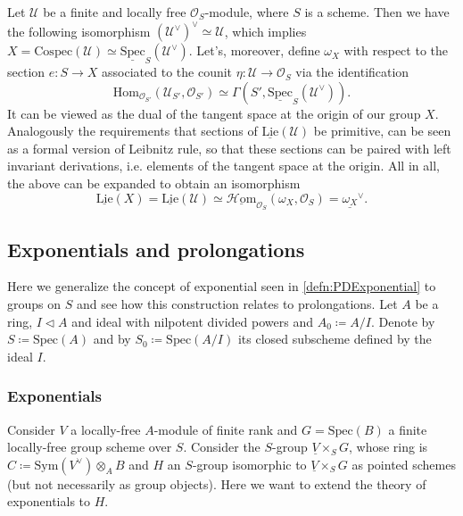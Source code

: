 \begin{rem}\label{LieDualConormalSheaf}
	Let $\mathcal{U}$ be a finite and locally free $\mathcal{O}_{ S }$-module,
	where $S$ is a scheme.
	Then we have the following isomorphism $(\mathcal{U}^\vee)^\vee \simeq \mathcal{U}$,
	which implies $X = \mathrm{Cospec}(\mathcal{U}) \simeq 
	\underline{\mathrm{Spec}}_S(\mathcal{U}^\vee)$.
	Let's, moreover, define $\omega_X$ with respect to the section $e\colon S \to X$
	associated to the counit $\eta\colon \mathcal{U} \to \mathcal{O}_{ S }$
	via the identification
	\begin{equation*}
		\mathrm{Hom}_{ \mathcal{O}_{ S' }}
		\left( \mathcal{U}_{S'}, \mathcal{O}_{ S' } \right) 
		\simeq
		\Gamma(S', \underline{\mathrm{Spec}}_S(\mathcal{U}^\vee))
	.\end{equation*}
	It can be viewed as the dual of the tangent space at the origin
	of our group $X$.
	Analogously the requirements that sections of $\underline{\mathrm{Lie}}(\mathcal{U})$
	be primitive, can be seen as a formal version of Leibnitz rule,
	so that these sections can be paired with left invariant derivations, i.e$.$
	elements of the tangent space at the origin.
	All in all, the above can be expanded to obtain an isomorphism
	\begin{equation*}
		\underline{\mathrm{Lie}}(X) =
		\underline{\mathrm{Lie}}(\mathcal{U}) \simeq
		\underline{\mathcal{H}\mathrm{om}}_{ \mathcal{O}_{ S } } 
		\left(\omega_X , \mathcal{O}_{ S } \right) =
		\underline{\omega_X}^\vee
	.\end{equation*}
\end{rem}


\subsection{Exponentials and prolongations}
Here we generalize the concept of exponential seen in \cref{defn:PDExponential}
to groups on $S$ and see how this construction relates to prolongations.
Let $A$ be a ring, $I \triangleleft A$ and ideal with nilpotent
divided powers and $A_0 \coloneqq A/I$.
Denote by $S \coloneqq \mathrm{Spec}(A)$
and by $S_0 \coloneqq \mathrm{Spec}(A/I)$ its closed
subscheme defined by the ideal $I$.



\subsubsection{Exponentials}
Consider $V$ a locally-free $A$-module of finite rank
and $G = \mathrm{Spec}(B)$ a finite locally-free 
group scheme over $S$.
Consider the $S$-group $\underline{V} \times_{ S } G$, whose ring is
$C \coloneqq \mathrm{Sym}(V^\vee) \otimes_A B$ and $H$ an $S$-group isomorphic
to $\underline{V} \times_{ S } G$ as pointed schemes (but not necessarily
as group objects).
Here we want to extend the theory of exponentials to $H$.


